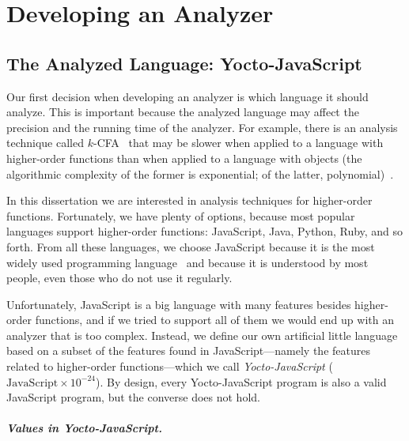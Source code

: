 \documentclass[12pt, oneside]{book}
\begin{document}
\chapter{Developing an Analyzer}


\section{The Analyzed Language: Yocto-JavaScript}

Our first decision when developing an analyzer is which language it should analyze. This is important because the analyzed language may affect the precision and the running time of the analyzer. For example, there is an analysis technique called \(k\)-CFA~\cite{k-cfa} that may be slower when applied to a language with higher-order functions than when applied to a language with objects (the algorithmic complexity of the former is exponential; of the latter, polynomial)~\cite{m-cfa}.

In this dissertation we are interested in analysis techniques for higher-order functions. Fortunately, we have plenty of options, because most popular languages support higher-order functions: JavaScript, Java, Python, Ruby, and so forth. From all these languages, we choose JavaScript because it is the most widely used programming language~\cite{stack-overflow-developer-survey, jet-brains-developer-survey} and because it is understood by most people, even those who do not use it regularly.

Unfortunately, JavaScript is a big language with many features besides higher-order functions, and if we tried to support all of them we would end up with an analyzer that is too complex. Instead, we define our own artificial little language based on a subset of the features found in JavaScript—namely the features related to higher-order functions—which we call \emph{Yocto-JavaScript} (\(\mathrm{JavaScript} \times 10^{-24}\)). By design, every Yocto-JavaScript program is also a valid JavaScript program, but the converse does not hold.

\paragraph{Values in Yocto-JavaScript.}
\end{document}
